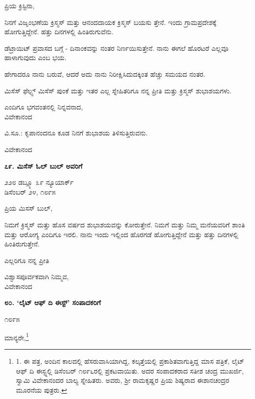 ಪ್ರಿಯ ಕ್ರಿಸ್ಟಿನಾ,

ನಿನಗೆ ವಿಜೃಂಭಣೆಯ ಕ್ರಿಸ್ಮಸ್ ಮತ್ತು ಆನಂದದಾಯಕ ಕ್ರಿಸ್ಮಸ್ ಬಯಸು ತ್ತೇನೆ. ಇಂದು ಗ್ರಾಮಪ್ರದೇಶಕ್ಕೆ ಹೋಗುತ್ತಿದ್ದೇನೆ. ಹತ್ತು ದಿನಗಳಲ್ಲಿ ಹಿಂತಿರುಗುವೆನು.

ಡೆಟ್ರಾಯಿಟ್ ಪ್ರವಾಸದ ಬಗ್ಗೆ - ದಿನಾಂಕವನ್ನು ನಂತರ ನಿರ್ಣಯಿಸುತ್ತೇನೆ. ನಾನು ಈಗಲೆ ಹೊರಟರೆ ಎಲ್ಲವೂ ಹಾಳಾಗುವುದು ಎಂಬ ಭಯ.

ಹೇಗಾದರೂ ನಾನು ಬರುವೆ, ಆದರೆ ಅದು ನಾನು ನಿರೀಕ್ಷಿಸಿದುದಕ್ಕಿಂತ ಹೆಚ್ಚು ಸಮಯದ ನಂತರ.

ಮಿಸೆಸ್ ಫೆಲ್ಪ್ಸ್ ಮಿಸೆಸ್ ಪುಂಕೆ ಮತ್ತು ಇತರ ಎಲ್ಲ ಸ್ನೇಹಿತರಿಗೂ ನನ್ನ ಪ್ರೀತಿ ಮತ್ತು ಕ್ರಿಸ್ಮಸ್ ಶುಭಾಶಯಗಳು.

\begin{flushright}
ಎಂದಿಗೂ ಭಗವಂತನಲ್ಲಿ ನಿನ್ನವನಾದ,\\ವಿವೇಕಾನಂದ
\end{flushright}

ವಿ.ಸೂ.: ಕೃಪಾನಂದನೂ ಕೂಡ ನಿನಗೆ ಶುಭಾಶಯ ತಿಳಿಸುತ್ತಿರುವನು.

\begin{flushright}
ವಿವೇಕಾನಂದ
\end{flushright}

\begin{center}
\textbf{೭೯. ಮಿಸೆಸ್ ಓಲ್ ಬುಲ್ ಅವರಿಗೆ}
\end{center}

\begin{flushright}
೨೨೮ ಡಬ್ಲ್ಯೂ ೩೯ ನ್ಯೂಯಾರ್ಕ್\\ಡಿಸೆಂಬರ್ ೨೪, ೧೮೯೫
\end{flushright}

ಪ್ರಿಯ ಮಿಸಸ್ ಬುಲ್,

ನಿಮಗೆ ಕ್ರಿಸ್ಮಸ್ ಮತ್ತು ಹೊಸ ವರ್ಷದ ಶುಭಾಶಯವನ್ನು ಕೋರುತ್ತೇನೆ. ನಿಮಗೆ ಮತ್ತು ನಿಮ್ಮ ಮನೆಯವರಿಗೆ ಶಾಂತಿ ಮತ್ತು ಆರೋಗ್ಯ ಎಂದಿಗೂ ಇರಲಿ. ನಾನು ಇಂದು ಇಲ್ಲಿಂದ ಹೊರಗಡೆ ಹೋಗುತ್ತಿದ್ದೇನೆ ಮತ್ತು ಹತ್ತು ದಿನಗಳಲ್ಲಿ ಹಿಂತಿರುಗುತ್ತೇನೆ.

ಎಲ್ಲರಿಗೂ ನನ್ನ ಪ್ರೀತಿ

\begin{flushright}
ವಿಶ್ವಾಸಪೂರ್ವಕವಾಗಿ ನಿಮ್ಮವ,\\ವಿವೇಕಾನಂದ
\end{flushright}

\begin{center}
\textbf{೮೦. ‘ಲೈಟ್ ಆಫ್ ದಿ ಈಸ್ಟ್’ ಸಂಪಾದಕರಿಗೆ}
\end{center}

\begin{flushright}
೧೮೯೫
\end{flushright}

ಮಾನ್ಯರೇ,\footnote{1. ಈ ಪತ್ರ, ಅಂದಿನ ಕಾಲದಲ್ಲಿ ಹೆಸರುವಾಸಿಯಾಗಿದ್ದ, ಕಲ್ಕತ್ತೆಯಲ್ಲಿ ಪ್ರಕಾಶಿತವಾಗುತ್ತಿದ್ದ ಮಾಸ ಪತ್ರಿಕೆ, ಲೈಟ್ ಆಫ್ ದಿ ಈಸ್ಟ್ನಲ್ಲಿ ಡಿಸೆಂಬರ್ ೧೮೯೬ರಲ್ಲಿ ಪ್ರಕಟವಾಯಿತು. ಅದರ ಸಂಪಾದಕರಾದ ಸತೀಶ ಚಂದ್ರ ಮುಖರ್ಜಿ, ಸ್ವಾಮಿ ವಿವೇಕಾನಂದರ ಬಾಲ್ಯ ಸ್ನೇಹಿತರು. ಅವರು, ಶ‍್ರೀ ರಾಮಕೃಷ್ಣರ ಪ್ರಿಯ ಶಿಷ್ಯರಾದ ಈಶಾನಚಂದ್ರರ ಮೂರನೆಯ ಪುತ್ರರು.}

